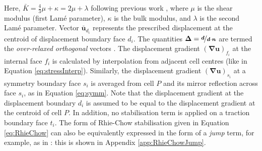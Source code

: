 \documentclass[sn-mathphys,Numbered]{sn-jnl}%
\newcommand{\bb}{\boldsymbol}
\begin{document}
Here, $\bar{K} = \frac{4}{3}\mu + \kappa = 2\mu + \lambda$ following previous work \cite{Jasak2000, Cardiff2017, Cardiff2018}, where $\mu$ is the shear modulus (first Lam\'{e} parameter), $\kappa$ is the bulk modulus, and $\lambda$ is the second Lam\'{e} parameter.
Vector $\bar{\bb{u}}_{d_i}$ represents the prescribed displacement at the centroid of displacement boundary face $d_i$.
The quantities $\bb{\Delta} = \nicefrac{\bb{d}}{\bb{d} \cdot \bb{n}}$ are termed the \emph{over-relaxed orthogonal} vectors \cite{Jasak1996}.
The displacement gradient $\left(\bb{\nabla} \bb{u} \right)_{f_i}$ at the internal face $f_i$ is calculated by interpolation from adjacent cell centres (like in Equation \ref{eq:stressInterp}).
Similarly, the displacement gradient $\left(\bb{\nabla} \bb{u} \right)_{s_i}$ at a symmetry boundary face $s_i$ is averaged from cell $P$ and its mirror reflection across face $s_i$, as in Equation \ref{eq:symm}.
Note that the displacement gradient at the displacement boundary $d_i$ is assumed to be equal to the displacement gradient at the centroid of cell $P$.
In addition, no stabilisation term is applied on a traction boundary face $t_i$.
The form of Rhie-Chow stabilisation given in Equation \ref{eq:RhieChow} can also be equivalently expressed in the form of a \emph{jump} term, for example, as in \citet{Nishikawa2010}: this is shown in Appendix \ref{app:RhieChowJump}.
\end{document}
